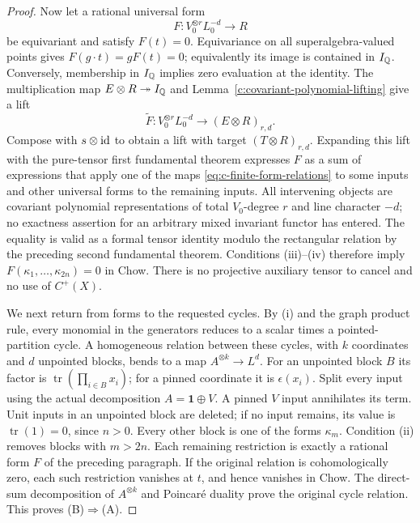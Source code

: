 \begin{proof}
Now let a rational universal form
\[
 F:V_0^{\otimes r}L_0^{-d}\longrightarrow R
\]
be equivariant and satisfy $F(t)=0$.  Equivariance on all
superalgebra-valued points gives $F(g\cdot t)=gF(t)=0$;
equivalently its image is contained in $I_\mathbb Q$.  Conversely,
membership in $I_\mathbb Q$ implies zero evaluation at the identity.
The multiplication map $E\otimes R\twoheadrightarrow I_\mathbb Q$
and Lemma~\ref{c:covariant-polynomial-lifting} give a lift
\[
 \widetilde F:V_0^{\otimes r}L_0^{-d}
                 \longrightarrow(E\otimes R)_{r,d}.
\]
Compose with $s\otimes\operatorname{id}$ to obtain a lift with target
$(T\otimes R)_{r,d}$.  Expanding this lift with the pure-tensor
first fundamental theorem expresses $F$ as a sum of expressions
that apply one of the maps \eqref{eq:c-finite-form-relations} to some inputs and other
universal forms to the remaining inputs.  All intervening
objects are covariant polynomial representations of total
$V_0$-degree $r$ and line character $-d$; no exactness assertion
for an arbitrary mixed invariant functor has entered.
The equality is valid as a formal tensor identity modulo the
rectangular relation by the preceding second fundamental
theorem.  Conditions (iii)--(iv) therefore imply
$F(\kappa_1,\ldots,\kappa_{2n})=0$ in Chow.  There is no
projective auxiliary tensor to cancel and no use of $C^+(X)$.

We next return from forms to the requested cycles.  By (i) and
the graph product rule, every monomial in the generators reduces
to a scalar times a pointed-partition cycle.  A homogeneous
relation between these cycles, with $k$ coordinates and $d$
unpointed blocks, bends to a map
$A^{\otimes k}\to L^d$.  For an unpointed block $B$ its factor
is $\operatorname{tr}(\prod_{i\in B}x_i)$; for a pinned
coordinate it is $\epsilon(x_i)$.  Split every input using the
actual decomposition $A=\mathbf1\oplus V$.  A pinned $V$ input
annihilates its term.  Unit inputs in an unpointed block are
deleted; if no input remains, its value is
$\operatorname{tr}(1)=0$, since $n>0$.  Every other block is one
of the forms $\kappa_m$.  Condition (ii) removes blocks with
$m>2n$.  Each remaining restriction is exactly a rational form
$F$ of the preceding paragraph.  If the original relation is
cohomologically zero, each such restriction vanishes at $t$,
and hence vanishes in Chow.  The direct-sum decomposition of
$A^{\otimes k}$ and Poincar\'e duality prove the original cycle
relation.  This proves (B)$\Rightarrow$(A).


\end{proof}
